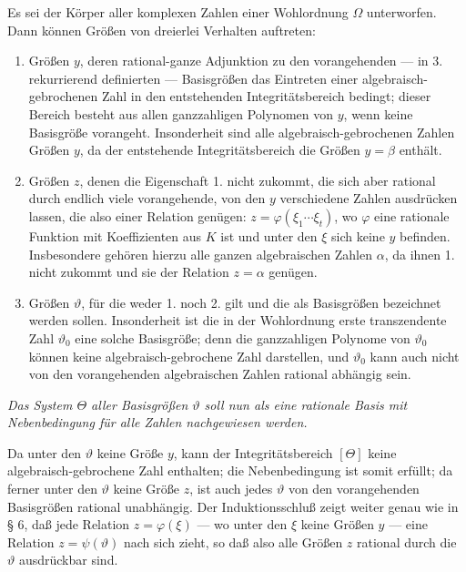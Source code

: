 Es sei der Körper aller komplexen Zahlen einer Wohlordnung $\Omega$
unterworfen. Dann können Größen von dreierlei Verhalten auftreten:
\begin{enumerate}
\item[1.] Größen $y$, deren rational-ganze Adjunktion zu den vorangehenden ---
in 3. rekurrierend definierten --- Basisgrößen das Eintreten einer
algebraisch-gebrochenen Zahl in den entstehenden Integritätsbereich bedingt;
dieser Bereich besteht aus allen ganzzahligen Polynomen von $y$, wenn keine
Basisgröße vorangeht. Insonderheit sind alle algebraisch-gebrochenen Zahlen
Größen $y$, da der entstehende Integritätsbereich die Größen $y=\beta$ enthält.
\item[2.] Größen $z$, denen die Eigenschaft 1. nicht zukommt, die sich aber
rational durch endlich viele vorangehende, von den $y$ verschiedene Zahlen
ausdrücken lassen, die also einer Relation genügen:
$z=\varphi(\xi_1\cdots\xi_t)$, wo $\varphi$ eine rationale Funktion mit
Koeffizienten aus $K$ ist und unter den $\xi$ sich keine $y$ befinden.
Insbesondere gehören hierzu alle ganzen algebraischen Zahlen $\alpha$, da ihnen
1. nicht zukommt und sie der Relation $z=\alpha$ genügen.
\item[3.] Größen $\vartheta$, für die weder 1. noch 2. gilt und die als
Basisgrößen bezeichnet werden sollen. Insonderheit ist die in der Wohlordnung
erste transzendente Zahl $\vartheta_0$ eine solche Basisgröße; denn die
ganzzahligen Polynome von $\vartheta_0$ können keine algebraisch-gebrochene
Zahl darstellen, und $\vartheta_0$ kann auch nicht von den vorangehenden
algebraischen Zahlen rational abhängig sein.
\end{enumerate}

\emph{Das System $\Theta$ aller Basisgrößen $\vartheta$ soll nun als eine
rationale Basis mit Nebenbedingung für alle Zahlen nachgewiesen werden.}

Da unter den $\vartheta$ keine Größe $y$, kann der Integritätsbereich $[\Theta]$
keine algebraisch-gebrochene Zahl enthalten; die Nebenbedingung ist somit
erfüllt; da ferner unter den $\vartheta$ keine Größe $z$, ist auch jedes
$\vartheta$ von den vorangehenden Basisgrößen rational unabhängig. Der
Induktionsschluß zeigt weiter genau wie in § 6, daß jede Relation
$z=\varphi(\xi)$ --- wo unter den $\xi$ keine Größen $y$ --- eine Relation
$z=\psi(\vartheta)$ nach sich zieht, so daß also alle Größen $z$ rational durch
die $\vartheta$ ausdrückbar sind.

